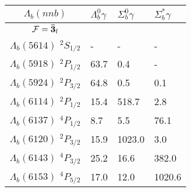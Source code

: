 \begin{tabular}{c |  p{0.65cm}  p{0.65cm}  p{0.65cm}} \hline \hline
$\Lambda_b(nnb)$  & $\Lambda_{b}^{0} \gamma$  & $\Sigma_{b}^{0} \gamma$  & $\Sigma_{b}^{*} \gamma$  \\ \hline
$\mathcal{F}={\bf {\bar{3}}}_{\rm f}$&&&\\ \hline
$\Lambda_b(5614)$ $^{2}S_{1/2}$&-  &-  &- \\
$\Lambda_b(5918)$ $^{2}P_{1/2}$&63.7  &0.4  &- \\
$\Lambda_b(5924)$ $^{2}P_{3/2}$&64.8  &0.5  &0.1 \\
$\Lambda_b(6114)$ $^{2}P_{1/2}$&15.4  &518.7  &2.8 \\
$\Lambda_b(6137)$ $^{4}P_{1/2}$&8.7  &5.5  &76.1 \\
$\Lambda_b(6120)$ $^{2}P_{3/2}$&15.9  &1023.0  &3.0 \\
$\Lambda_b(6143)$ $^{4}P_{3/2}$&25.2  &16.6  &382.0 \\
$\Lambda_b(6153)$ $^{4}P_{5/2}$&17.0  &12.0  &1020.6 \\
\hline \hline
\end{tabular}
